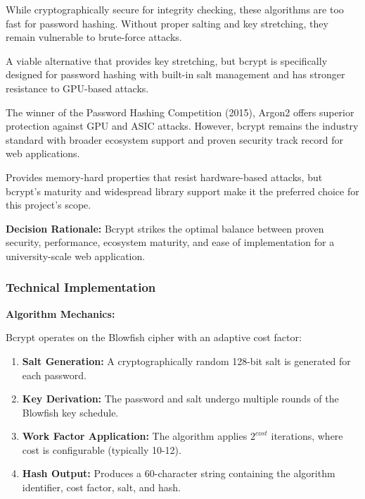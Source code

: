 \documentclass[12pt,a4paper]{article}
\begin{document}
\begin{tcolorbox}[colback=primaryblue!5, colframe=primaryblue, boxrule=1pt, arc=3pt, left=10pt, right=10pt, top=8pt, bottom=8pt]
\begin{description}[leftmargin=2em, itemsep=8pt, style=nextline]
    \item[\textbf{Plain SHA-256/SHA-512 (Insufficient):}] While cryptographically secure for integrity checking, these algorithms are too fast for password hashing. Without proper salting and key stretching, they remain vulnerable to brute-force attacks.
    
    \item[\textbf{PBKDF2 (Alternative):}] A viable alternative that provides key stretching, but bcrypt is specifically designed for password hashing with built-in salt management and has stronger resistance to GPU-based attacks.
    
    \item[\textbf{Argon2 (Future Consideration):}] The winner of the Password Hashing Competition (2015), Argon2 offers superior protection against GPU and ASIC attacks. However, bcrypt remains the industry standard with broader ecosystem support and proven security track record for web applications.
    
    \item[\textbf{Scrypt (Alternative):}] Provides memory-hard properties that resist hardware-based attacks, but bcrypt's maturity and widespread library support make it the preferred choice for this project's scope.
\end{description}

\vspace{0.5em}

\textbf{Decision Rationale:} Bcrypt strikes the optimal balance between proven security, performance, ecosystem maturity, and ease of implementation for a university-scale web application.

\subsubsection{Technical Implementation}

\textbf{Algorithm Mechanics:}

Bcrypt operates on the Blowfish cipher with an adaptive cost factor:

\begin{enumerate}[leftmargin=2em, itemsep=6pt]
    \item \textbf{Salt Generation:} A cryptographically random 128-bit salt is generated for each password.
    \item \textbf{Key Derivation:} The password and salt undergo multiple rounds of the Blowfish key schedule.
    \item \textbf{Work Factor Application:} The algorithm applies $2^{cost}$ iterations, where cost is configurable (typically 10-12).
    \item \textbf{Hash Output:} Produces a 60-character string containing the algorithm identifier, cost factor, salt, and hash.
\end{enumerate}


\end{tcolorbox}
\end{document}
